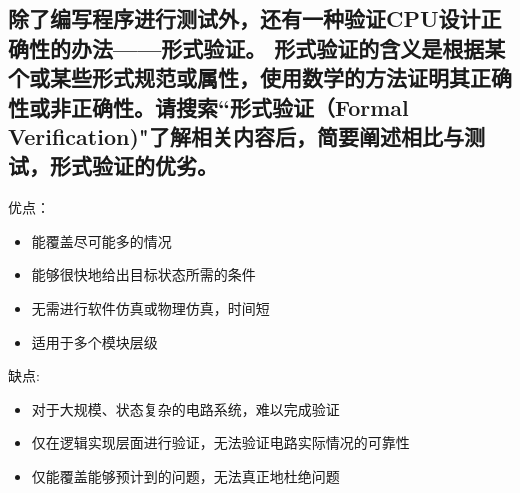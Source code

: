 \documentclass[UTF8]{ctexart}
\begin{document}
\subsection{除了编写程序进行测试外，还有一种验证CPU设计正确性的办法——形式验证。 形式验证的含义是根据某个或某些形式规范或属性，使用数学的方法证明其正确性或非正确性。请搜索“形式验证（Formal Verification)"了解相关内容后，简要阐述相比与测试，形式验证的优劣。}
优点：
\begin{itemize}
	\item 能覆盖尽可能多的情况
	\item 能够很快地给出目标状态所需的条件
	\item 无需进行软件仿真或物理仿真，时间短
	\item 适用于多个模块层级
\end{itemize}
\indent \indent 缺点:
\begin{itemize}
	\item 对于大规模、状态复杂的电路系统，难以完成验证
	\item 仅在逻辑实现层面进行验证，无法验证电路实际情况的可靠性
	\item 仅能覆盖能够预计到的问题，无法真正地杜绝问题
\end{itemize}
\end{document}
